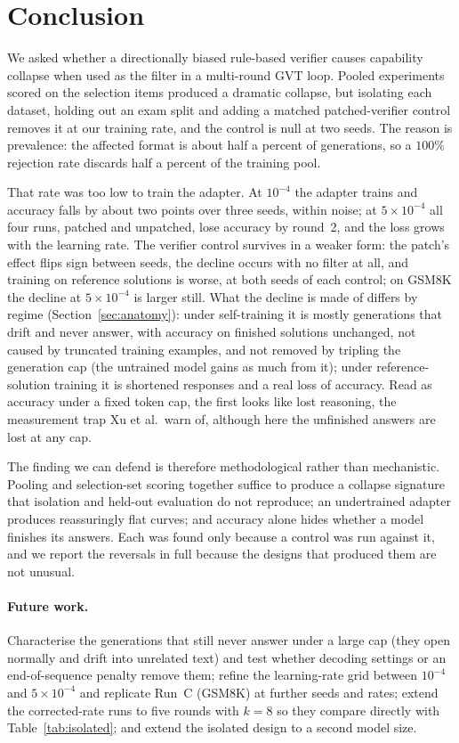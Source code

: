 \documentclass[runningheads]{llncs}
\begin{document}
\section{Conclusion}
\label{sec:conclusion}

We asked whether a directionally biased rule-based verifier causes capability
collapse when used as the filter in a multi-round GVT loop. Pooled experiments
scored on the selection items produced a dramatic collapse, but isolating each
dataset, holding out an exam split and adding a matched patched-verifier control
removes it at our training rate, and the control is null at two seeds. The reason
is prevalence: the affected format is about half a percent of generations, so a
$100\%$ rejection rate discards half a percent of the training pool.

That rate was too low to train the adapter. At $10^{-4}$ the adapter trains and
accuracy falls by about two points over three seeds, within noise; at
$5\times10^{-4}$ all four runs, patched and unpatched, lose accuracy by round~2,
and the loss grows with the learning rate.
The verifier control survives in a weaker form: the patch's effect flips sign
between seeds, the decline occurs with no filter at all, and training on
reference solutions is worse, at both seeds of each control; on GSM8K the decline
at $5\times10^{-4}$ is larger still. What the decline is made of differs by regime
(Section~\ref{sec:anatomy}): under self-training it is mostly generations that
drift and never answer, with accuracy on finished solutions unchanged, not caused
by truncated training examples, and not removed by tripling the generation cap
(the untrained model gains as much from it); under reference-solution training it
is shortened responses and a real loss of accuracy. Read as accuracy under a fixed
token cap, the first looks like lost reasoning, the measurement trap Xu et al.\
warn of, although here the unfinished answers are lost at any cap.

The finding we can defend is therefore methodological rather than mechanistic.
Pooling and selection-set scoring together suffice to produce a collapse
signature that isolation and held-out evaluation do not reproduce; an undertrained
adapter produces reassuringly flat curves; and accuracy alone hides whether a
model finishes its answers. Each was found only because a control was run against
it, and we report the reversals in full because the designs that produced them
are not unusual.

\paragraph{Future work.}
Characterise the generations that still never answer under a large cap (they open
normally and drift into unrelated text) and test whether decoding settings or an
end-of-sequence penalty remove them; refine the learning-rate grid between $10^{-4}$ and $5\times10^{-4}$ and replicate
Run~C (GSM8K) at further seeds and rates; extend the corrected-rate runs to five rounds with $k=8$ so they compare
directly with Table~\ref{tab:isolated}; and extend the isolated design to a second
model size.
\end{document}
